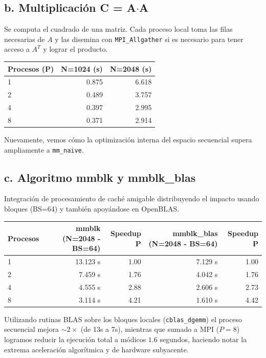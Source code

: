 \documentclass[11pt,a4paper]{article}
\begin{document}
\subsection*{b. Multiplicación C = A$\cdot$A}
Se computa el cuadrado de una matriz. Cada proceso local toma las filas necesarias de $A$ y las disemina con \texttt{MPI\_Allgather} si es necesario para tener acceso a $A^T$ y lograr el producto.

\begin{center}
\begin{tabular}{|l|r|r|}
\hline
\textbf{Procesos (P)} & \textbf{N=1024 (s)} & \textbf{N=2048 (s)} \\
\hline
1 & 0.875 & 6.618 \\
2 & 0.489 & 3.757 \\
4 & 0.397 & 2.995 \\
8 & 0.371 & 2.914 \\
\hline
\end{tabular}
\end{center}
Nuevamente, vemos cómo la optimización interna del espacio secuencial supera ampliamente a \texttt{mm\_naive}.

\subsection*{c. Algoritmo mmblk y mmblk\_blas}

Integración de procesamiento de caché amigable distribuyendo el impacto usando bloques (BS=64) y también apoyándose en OpenBLAS.
\begin{center}
\begin{tabular}{|l|r|r|r|r|}
\hline
\textbf{Procesos} & \textbf{mmblk (N=2048 - BS=64)} & \textbf{Speedup P} & \textbf{mmblk\_blas (N=2048 - BS=64)} & \textbf{Speedup P} \\
\hline
1 & 13.123 s & 1.00 & 7.129 s & 1.00 \\
2 & 7.459 s & 1.76 & 4.042 s & 1.76 \\
4 & 4.555 s & 2.88 & 2.606 s & 2.73 \\
8 & 3.114 s & 4.21 & 1.610 s & 4.42 \\
\hline
\end{tabular}
\end{center}
Utilizando rutinas BLAS sobre los bloques locales (\texttt{cblas\_dgemm}) el proceso secuencial mejora $\sim 2\times$ (de 13s a 7s), mientras que sumado a MPI ($P=8$) logramos reducir la ejecución total a módicos $1.6$ segundos, haciendo notar la extrema aceleración algorítmica y de hardware subyacente.
\end{document}
